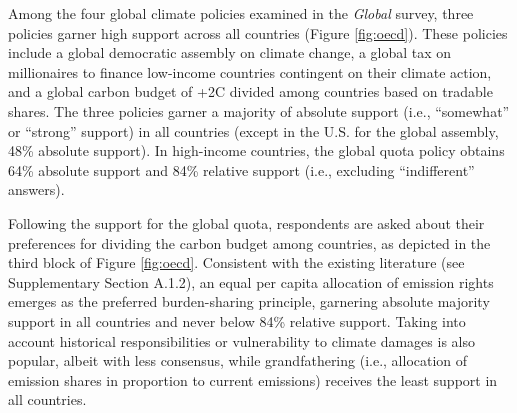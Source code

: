 \documentclass{nature}
\begin{document}
Among the four global climate policies examined in the \textit{Global} survey, three policies garner high support across all countries (Figure \ref{fig:oecd}). These policies include a global democratic assembly on climate change, a global tax on millionaires to finance low-income countries contingent on their climate action, and a global carbon budget of +2\textdegree{}C divided among countries based on tradable shares. %
The three policies garner a majority of absolute support (i.e., ``somewhat'' or ``strong'' support) in all countries (except in the U.S. for the global assembly, 48\% absolute support). In high-income countries, the global quota policy obtains 64\% absolute support and 84\% relative support (i.e., excluding ``indifferent'' answers). 

Following the support for the global quota, respondents are asked about their preferences for dividing the carbon budget among countries, as depicted in the third block of Figure \ref{fig:oecd}. Consistent with the existing literature (see Supplementary Section A.1.2), an equal per capita allocation of emission rights emerges as the preferred burden-sharing principle, garnering absolute majority support in all countries and never below 84\% relative support. Taking into account historical responsibilities or vulnerability to climate damages is also popular, albeit with less consensus, while grandfathering (i.e., allocation of emission shares in proportion to current emissions) receives the least support in all countries.
\end{document}
